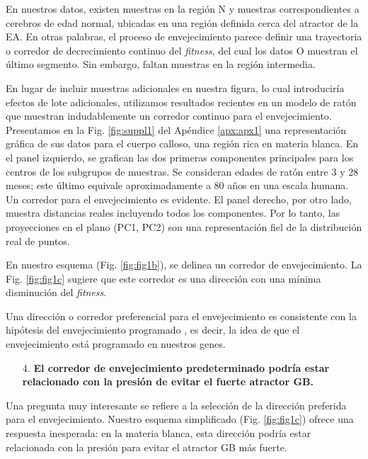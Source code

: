 En nuestros datos, existen muestras en la región N y muestras correspondientes a cerebros de edad normal, ubicadas en una región definida cerca del atractor de la EA. En otras palabras, el proceso de envejecimiento parece definir una trayectoria o corredor de decrecimiento continuo del \textit{fitness}, del cual los datos O muestran el último segmento. Sin embargo, faltan muestras en la región intermedia.

En lugar de incluir muestras adicionales en nuestra figura, lo cual introduciría efectos de lote adicionales, utilizamos resultados recientes en un modelo de ratón \cite{hahn2023atlas} que muestran indudablemente un corredor continuo para el envejecimiento. Presentamos en la Fig. \ref{fig:suppl1} del Apéndice \ref{apx:apx1} una representación gráfica de sus datos para el cuerpo calloso, una región rica en materia blanca. En el panel izquierdo, se grafican las dos primeras componentes principales para los centros de los subgrupos de muestras. Se consideran edades de ratón entre 3 y 28 meses; este último equivale aproximadamente a 80 años en una escala humana. Un corredor para el envejecimiento es evidente. El panel derecho, por otro lado, muestra distancias reales incluyendo todos los componentes. Por lo tanto, las proyecciones en el plano (PC1, PC2) son una representación fiel de la distribución real de puntos.

En nuestro esquema (Fig. \ref{fig:fig1b}), se delinea un corredor de envejecimiento. La Fig. \ref{fig:fig1c} sugiere que este corredor es una dirección con una mínima disminución del \textit{fitness}.

Una dirección o corredor preferencial para el envejecimiento es consistente con la hipótesis del envejecimiento programado \cite{Magalh_es_2012, Gems_2022}, es decir, la idea de que el envejecimiento está programado en nuestros genes.

\begin{enumerate}
	\item[4.] \textbf{El corredor de envejecimiento predeterminado podría estar relacionado con la presión de evitar el fuerte atractor GB.}
\end{enumerate}

Una pregunta muy interesante se refiere a la selección de la dirección preferida para el envejecimiento. Nuestro esquema simplificado (Fig. \ref{fig:fig1c}) ofrece una respuesta inesperada: en la materia blanca, esta dirección podría estar relacionada con la presión para evitar el atractor GB más fuerte.

